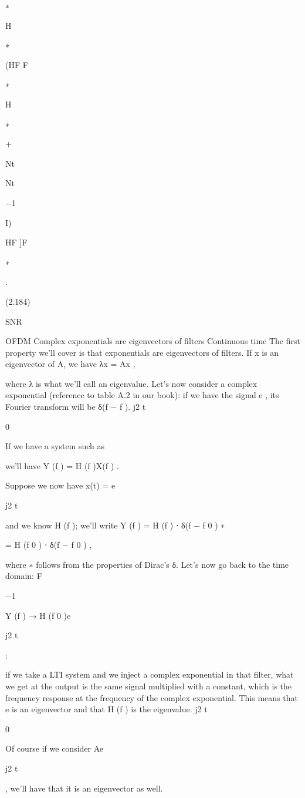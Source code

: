 {∗

H

∗

(HF F

∗

H

∗

+

Nt

Nt

−1

I)

HF ]F

∗

.

(2.184)

SNR

OFDM Complex exponentials are eigenvectors of filters Continuous time The first property we'll cover is that exponentials are eigenvectors of filters. If x is an eigenvector of A, we have λx = Ax ,

where λ is what we'll call an eigenvalue.
Let's now consider a complex exponential (reference to table A.2 in our book): if we have the signal e
, its Fourier transform will be δ(f − f ).
j2 t

0

If we have a system such as

we'll have Y (f ) = H (f )X(f ) .

Suppose we now have x(t) = e

j2 t

and we know H (f ); we'll write Y (f ) = H (f ) ⋅ δ(f − f 0 )
∗

= H (f 0 ) ⋅ δ(f − f 0 ) ,

where ∗ follows from the properties of Dirac's δ.
Let's now go back to the time domain:
F

−1

Y (f ) → H (f 0 )e

j2 t

;

if we take a LTI system and we inject a complex exponential in that filter, what we get at the output is the same signal multiplied with a constant, which is the frequency response at the frequency of the complex exponential.
This means that e is an eigenvector and that H (f ) is the eigenvalue.
j2 t

0

Of course if we consider Ae

j2 t

, we'll have that it is an eigenvector as well.

}

